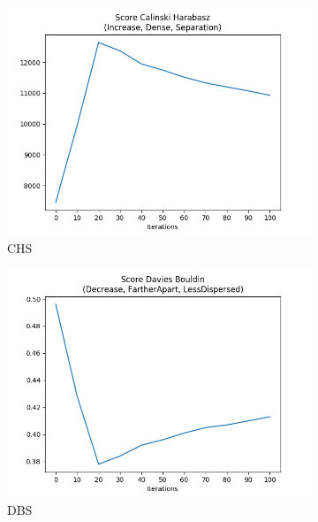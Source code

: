 		\begin{figure}[H]
			\centering
			\begin{subfigure}{0.3\textwidth}
				\centering
				\includegraphics[width=1.1\linewidth]{images/plotA0_CHS_AIDSPerfect_E_GDL_09_22h-03m}
				\caption{CHS}
				\label{fig:plota0chsaidsperfectegdl0922h-03m}
			\end{subfigure}		
			\begin{subfigure}{0.3\textwidth}
				\centering
				\includegraphics[width=1.1\linewidth]{images/plotA0_DBS_AIDSPerfect_E_GDL_09_22h-03m}
				\caption{DBS}
				\label{fig:plota0dbsaidsperfectegdl0922h-03m}
			\end{subfigure}
			\begin{subfigure}{0.3\textwidth}

\end{subfigure}
\end{figure}
